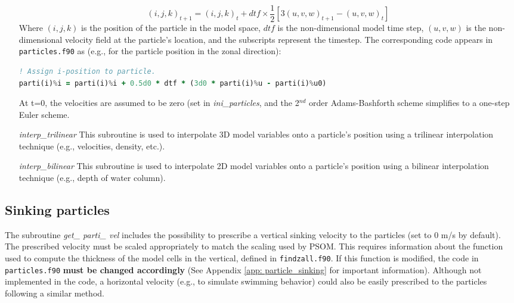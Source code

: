 \documentclass[12pt,letterpaper,titlepage]{article}
\newcommand{\fixme}[1]{\color{red}$<$\textbf{FIX ME: #1}$>$\color{black}}
\begin{document}
\begin{itemize}
	\begin{equation*}
(i,j,k)_{t+1}= (i,j,k)_{t} + dtf \times \frac{1}{2}[3(u,v,w)_{t+1} - (u,v,w)_{t}]
\end{equation*}
	Where $(i,j,k)$ is the position of the particle in the model space, $dtf$ is the non-dimensional model time step, $(u,v,w)$ is the non-dimensional velocity field at the particle's location, and the subscripts represent the timestep. The corresponding code appears in \texttt{particles.f90} as (e.g., for the particle position in the zonal direction):
	\begin{lstlisting}[language=fortran]
! Assign i-position to particle.
parti(i)%i = parti(i)%i + 0.5d0 * dtf * (3d0 * parti(i)%u - parti(i)%u0)
\end{lstlisting}
	At t=0, the velocities are assumed to be zero (set in \textit{ini\_particles}, and the 2$^{nd}$ order Adams-Bashforth scheme simplifies to a one-step Euler scheme.
	
	\item[\textit{interp\_trilinear}]	This subroutine is used to interpolate 3D model variables onto a particle's position using a trilinear interpolation technique (e.g., velocities, density, etc.).

	\item[\textit{interp\_bilinear}]	This subroutine is used to interpolate 2D model variables onto a particle's position using a bilinear interpolation technique (e.g., depth of water column).
\end{itemize}

\subsection{Sinking particles}

The subroutine \textit{get\_ parti\_ vel} includes the possibility to prescribe a vertical sinking velocity to the particles (set to 0 m/s by default). The prescribed velocity must be scaled appropriately to match the scaling used by PSOM. This requires information about the function used to compute the thickness of the model cells in the vertical, defined in \texttt{findzall.f90}. If this function is modified, the code in \texttt{particles.f90} \textbf{must be changed accordingly} (See Appendix \ref{app: particle_sinking} for important information). %
Although not implemented in the code, a horizontal velocity (e.g., to simulate swimming behavior) could also be easily prescribed to the particles following a similar method.
\end{document}
